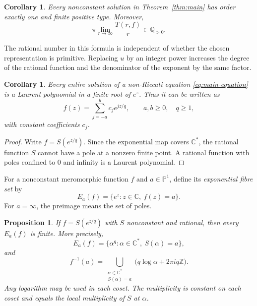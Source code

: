 \documentclass[11pt,reqno]{amsart}
\numberwithin{equation}{section}
\newtheorem{proposition}[theorem]{Proposition}
\newtheorem{corollary}[theorem]{Corollary}
\theoremstyle{definition}
\theoremstyle{remark}
\newcommand{\C}{\mathbb C}
\newcommand{\Z}{\mathbb Z}
\newcommand{\Q}{\mathbb Q}
\newcommand{\PP}{\mathbb P}
\begin{document}
\begin{corollary}
\label{cor:order}
Every nonconstant solution in Theorem~\ref{thm:main} has order exactly
one and finite positive type. Moreover,
\[
 \pi\lim_{r\to\infty}\frac{T(r,f)}r\in\Q_{>0}.
\]
\end{corollary}

The rational number in this formula is independent of whether the
chosen representation is primitive. Replacing $u$ by an integer
power increases the degree of the rational function and the
denominator of the exponent by the same factor.

\begin{corollary}
\label{cor:entire}
Every entire solution of a non-Riccati equation
\eqref{eq:main-equation} is a Laurent polynomial in a finite root
of $e^z$. Thus it can be written as
\begin{equation}
 f(z)=\sum_{j=-a}^{b}c_j e^{jz/q},
 \qquad a,b\geq0,\quad q\geq1,
 \label{eq:laurent-solution}
\end{equation}
with constant coefficients $c_j$.
\end{corollary}

\begin{proof}
Write $f=S(e^{z/q})$. Since the exponential map covers $\C^*$,
the rational function $S$ cannot have a pole at a nonzero finite
point. A rational function with poles confined to $0$ and infinity
is a Laurent polynomial.
\end{proof}

For a nonconstant meromorphic function $f$ and $a\in\PP^1$, define
its \emph{exponential fibre set} by
\begin{equation}
 E_a(f)=\{e^z:z\in\C,\ f(z)=a\}.
 \label{eq:exponential-fibre}
\end{equation}
For $a=\infty$, the preimage means the set of poles.

\begin{proposition}
\label{prop:fibres}
If $f=S(e^{z/q})$ with $S$ nonconstant and rational, then every
$E_a(f)$ is finite. More precisely,
\begin{equation}
 E_a(f)=\{\alpha^q:\alpha\in\C^*,\ S(\alpha)=a\},
 \label{eq:fibre-formula}
\end{equation}
and
\begin{equation}
 f^{-1}(a)=
 \bigcup_{\substack{\alpha\in\C^*\\S(\alpha)=a}}
 \bigl(q\log\alpha+2\pi iq\Z\bigr).
 \label{eq:lattice-fibres}
\end{equation}
Any logarithm may be used in each coset. The multiplicity is constant
on each coset and equals the local multiplicity of $S$ at $\alpha$.
\end{proposition}
\end{document}

